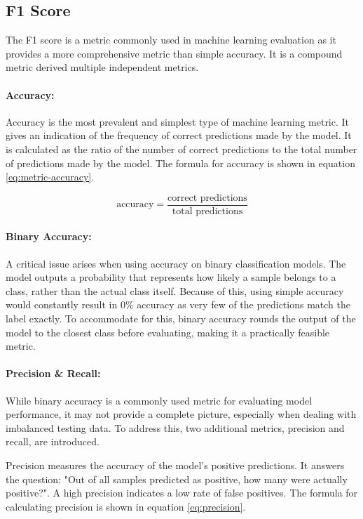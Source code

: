 \subsection{F1 Score}

The F1 score is a metric commonly used in machine learning evaluation as it provides a more comprehensive metric than simple accuracy. It is a compound metric derived multiple independent metrics.

\paragraph{Accuracy:}
Accuracy is the most prevalent and simplest type of machine learning metric. It gives an indication of the frequency of correct predictions made by the model. It is calculated as the ratio of the number of correct predictions to the total number of predictions made by the model. The formula for accuracy is shown in equation \ref{eq:metric-accuracy}. 

\begin{equation}
	\text{accuracy} = \frac{\text{correct predictions}}{\text{total predictions}}
	\label{eq:metric-accuracy}
\end{equation}

\paragraph{Binary Accuracy:}
A critical issue arises when using accuracy on binary classification models. The model outputs a probability that represents how likely a sample belongs to a class, rather than the actual class itself. Because of this, using simple accuracy would constantly result in 0\% accuracy as very few of the predictions match the label exactly. To accommodate for this, binary accuracy rounds the output of the model to the closest class before evaluating, making it a practically feasible metric.

\paragraph{Precision \& Recall:}
\label{sec:precision-recall}
While binary accuracy is a commonly used metric for evaluating model performance, it may not provide a complete picture, especially when dealing with imbalanced testing data. To address this, two additional metrics, precision and recall, are introduced.

Precision measures the accuracy of the model's positive predictions. It answers the question: "Out of all samples predicted as positive, how many were actually positive?". A high precision indicates a low rate of false positives. The formula for calculating precision is shown in equation \ref{eq:precision}.

